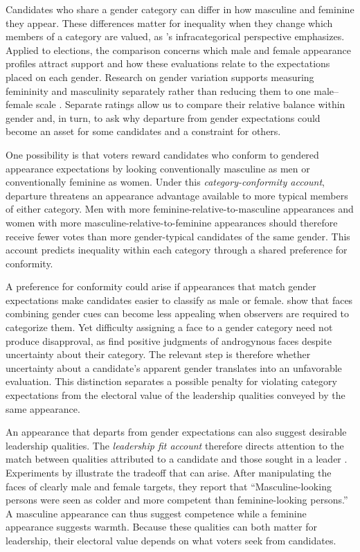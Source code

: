 \documentclass[11pt,a4paper]{article}\usepackage[]{graphicx}\usepackage[]{xcolor}
\begin{document}
Candidates who share a gender category can differ in how masculine and feminine they appear. These differences matter for inequality when they change which members of a category are valued, as \textcite{Monk2022}'s infracategorical perspective emphasizes. Applied to elections, the comparison concerns which male and female appearance profiles attract support and how these evaluations relate to the expectations placed on each gender. Research on gender variation supports measuring femininity and masculinity separately rather than reducing them to one male--female scale \parencite{Magliozzi2016}. Separate ratings allow us to compare their relative balance within gender and, in turn, to ask why departure from gender expectations could become an asset for some candidates and a constraint for others.

One possibility is that voters reward candidates who conform to gendered appearance expectations by looking conventionally masculine as men or conventionally feminine as women. Under this \emph{category-conformity account}, departure threatens an appearance advantage available to more typical members of either category. Men with more feminine-relative-to-masculine appearances and women with more masculine-relative-to-feminine appearances should therefore receive fewer votes than more gender-typical candidates of the same gender. This account predicts inequality within each category through a shared preference for conformity.

A preference for conformity could arise if appearances that match gender expectations make candidates easier to classify as male or female. \textcite{Owen2016} show that faces combining gender cues can become less appealing when observers are required to categorize them. Yet difficulty assigning a face to a gender category need not produce disapproval, as \textcite{Ansani2024} find positive judgments of androgynous faces despite uncertainty about their category. The relevant step is therefore whether uncertainty about a candidate's apparent gender translates into an unfavorable evaluation. This distinction separates a possible penalty for violating category expectations from the electoral value of the leadership qualities conveyed by the same appearance.

An appearance that departs from gender expectations can also suggest desirable leadership qualities. The \emph{leadership fit account} therefore directs attention to the match between qualities attributed to a candidate and those sought in a leader \parencite{Eagly2002}. Experiments by \textcite[1]{Walker2017} illustrate the tradeoff that can arise. After manipulating the faces of clearly male and female targets, they report that ``Masculine-looking persons were seen as colder and more competent than feminine-looking persons.'' A masculine appearance can thus suggest competence while a feminine appearance suggests warmth. Because these qualities can both matter for leadership, their electoral value depends on what voters seek from candidates.
\end{document}

